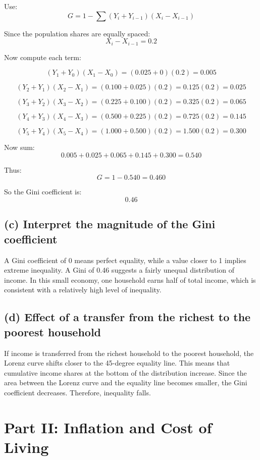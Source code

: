 \documentclass[12pt]{article}
\begin{document}
Use:
\[
G = 1 - \sum (Y_i + Y_{i-1})(X_i - X_{i-1})
\]

Since the population shares are equally spaced:
\[
X_i - X_{i-1} = 0.2
\]

Now compute each term:

\[
(Y_1 + Y_0)(X_1 - X_0) = (0.025 + 0)(0.2) = 0.005
\]

\[
(Y_2 + Y_1)(X_2 - X_1) = (0.100 + 0.025)(0.2) = 0.125(0.2)=0.025
\]

\[
(Y_3 + Y_2)(X_3 - X_2) = (0.225 + 0.100)(0.2)=0.325(0.2)=0.065
\]

\[
(Y_4 + Y_3)(X_4 - X_3) = (0.500 + 0.225)(0.2)=0.725(0.2)=0.145
\]

\[
(Y_5 + Y_4)(X_5 - X_4) = (1.000 + 0.500)(0.2)=1.500(0.2)=0.300
\]

Now sum:
\[
0.005 + 0.025 + 0.065 + 0.145 + 0.300 = 0.540
\]

Thus:
\[
G = 1 - 0.540 = 0.460
\]

So the Gini coefficient is:
\[
\boxed{0.46}
\]

\subsection*{(c) Interpret the magnitude of the Gini coefficient}

A Gini coefficient of 0 means perfect equality, while a value closer to 1 implies extreme inequality. A Gini of 0.46 suggests a fairly unequal distribution of income. In this small economy, one household earns half of total income, which is consistent with a relatively high level of inequality.

\subsection*{(d) Effect of a transfer from the richest to the poorest household}

If income is transferred from the richest household to the poorest household, the Lorenz curve shifts closer to the 45-degree equality line. This means that cumulative income shares at the bottom of the distribution increase. Since the area between the Lorenz curve and the equality line becomes smaller, the Gini coefficient decreases. Therefore, inequality falls.

\section*{Part II: Inflation and Cost of Living}
\end{document}
